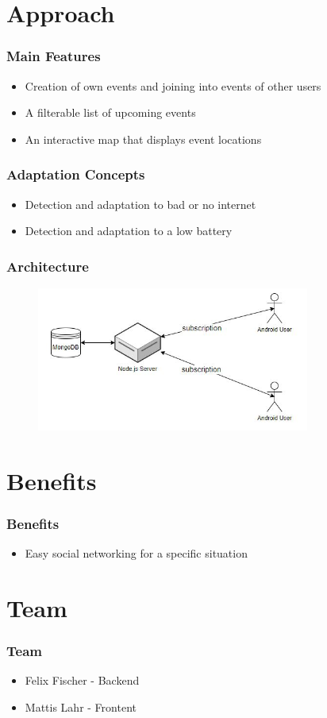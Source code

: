 \documentclass[aspectratio=169]{beamer}
\begin{document}
\section{Approach}

	\begin{frame}
		\frametitle{Main Features}
		\begin{itemize}
			\item Creation of own events and joining into events of other users
			\item A filterable list of upcoming events
			\item An interactive map that displays event locations
		\end{itemize}
	\end{frame}

	\begin{frame}
		\frametitle{Adaptation Concepts}
		\begin{itemize}
			\item Detection and adaptation to bad or no internet
			\item Detection and adaptation to a low battery
		\end{itemize}
	\end{frame}

	\begin{frame}
		\frametitle{Architecture}
		 \begin{figure}
			\centering
			\includegraphics[width=0.8\textwidth]{media/architecture.jpg}
		\end{figure}
	\end{frame}

\section{Benefits}

	\begin{frame}
		\frametitle{Benefits}
		\begin{itemize}
			\item Easy social networking for a specific situation
		\end{itemize}
	\end{frame}

\section{Team}

	\begin{frame}
		\frametitle{Team}
		\begin{itemize}
			\item Felix Fischer - Backend 
			\item Mattis Lahr - Frontent
		\end{itemize}
	\end{frame}
\end{document}
